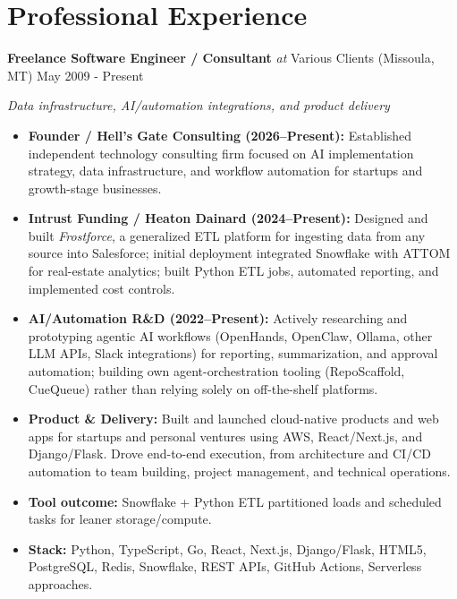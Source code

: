 \documentclass[10pt]{article}
\newcommand{\roleline}[4]{%
  \noindent\textbf{#1} \textit{at} #2 #3 \hfill #4\par
}
\begin{document}
\section*{Professional Experience}


\roleline{Freelance Software Engineer / Consultant}{Various Clients}{(Missoula, MT)}{May 2009 - Present}
\emph{Data infrastructure, AI/automation integrations, and product delivery}\par
\begin{itemize}
  \item \textbf{Founder / Hell's Gate Consulting (2026--Present):} Established independent technology consulting firm focused on AI implementation strategy, data infrastructure, and workflow automation for startups and growth-stage businesses.
  \item \textbf{Intrust Funding / Heaton Dainard (2024--Present):} Designed and built \textit{Frostforce}, a generalized ETL platform for ingesting data from any source into Salesforce; initial deployment integrated Snowflake with ATTOM for real-estate analytics; built Python ETL jobs, automated reporting, and implemented cost controls.
  \item \textbf{AI/Automation R\&D (2022--Present):} Actively researching and prototyping agentic AI workflows (OpenHands, OpenClaw, Ollama, other LLM APIs, Slack integrations) for reporting, summarization, and approval automation; building own agent-orchestration tooling (RepoScaffold, CueQueue) rather than relying solely on off-the-shelf platforms.
  \item \textbf{Product \& Delivery:} Built and launched cloud-native products and web apps for startups and personal ventures using AWS, React/Next.js, and Django/Flask. Drove end-to-end execution, from architecture and CI/CD automation to team building, project management, and technical operations.
  \item \textbf{Tool \textrightarrow{} outcome:} Snowflake + Python ETL \textrightarrow{} partitioned loads and scheduled tasks for leaner storage/compute.
  \item \textbf{Stack:} Python, TypeScript, Go, React, Next.js, Django/Flask, HTML5, PostgreSQL, Redis, Snowflake, REST APIs, GitHub Actions, Serverless approaches.
\end{itemize}
\end{document}

